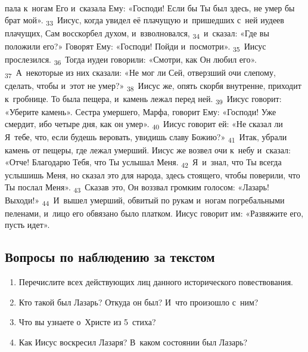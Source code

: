 \documentclass[a4paper,12pt]{article}
\begin{document}
пала к~ногам Его и~сказала Ему: «Господи! Если бы Ты был здесь, не умер бы брат мой». \textsubscript{33}~Иисус, когда увидел её плачущую и~пришедших с~ней иудеев плачущих, Сам восскорбел духом, и~взволновался, \textsubscript{34}~и~сказал: «Где вы положили его?» Говорят Ему: «Господи! Пойди и~посмотри». \textsubscript{35}~Иисус прослезился. \textsubscript{36}~Тогда иудеи говорили: «Смотри, как Он любил его». \textsubscript{37}~А~некоторые из них сказали: «Не мог ли Сей, отверзший очи слепому, сделать, чтобы и~этот не умер?» \textsubscript{38}~Иисус же, опять скорбя внутренне, приходит к~гробнице. То была пещера, и~камень лежал перед ней. \textsubscript{39}~Иисус говорит: «Уберите камень». Сестра умершего, Марфа, говорит Ему: «Господи! Уже смердит, ибо четыре дня, как он умер». \textsubscript{40}~Иисус говорит ей: «Не сказал ли Я~тебе, что, если будешь веровать, увидишь славу Божию?» \textsubscript{41}~Итак, убрали камень от пещеры, где лежал умерший. Иисус же возвел очи к~небу и~сказал: «Отче! Благодарю Тебя, что Ты услышал Меня. \textsubscript{42}~Я~и~знал, что Ты всегда услышишь Меня, но сказал это для народа, здесь стоящего, чтобы поверили, что Ты послал Меня». \textsubscript{43}~Сказав это, Он воззвал громким голосом: «Лазарь! Выходи!» \textsubscript{44}~И~вышел умерший, обвитый по рукам и~ногам погребальными пеленами, и~лицо его обвязано было платком. Иисус говорит им: «Развяжите его, пусть идет». 

\subsection*{Вопросы по наблюдению за текстом}
\begin{enumerate}
    \item Перечислите всех действующих лиц данного исторического повествования. 
    
    \myline
    
    \myline
    \item Кто такой был Лазарь? Откуда он был? И~что произошло с~ним? 
    
    \myline
    
    \myline
    \item Что вы узнаете о~Христе из 5~стиха? 
    
    \myline
    
    \myline
    \item Как Иисус воскресил Лазаря? В~каком состоянии был Лазарь? 
    
    \myline
    
    \myline
\end{enumerate}
\end{document}
